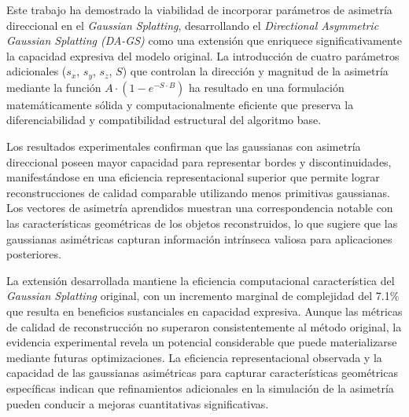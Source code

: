 \begin{conclusions}

Este trabajo ha demostrado la viabilidad de incorporar parámetros de asimetría direccional en el \textit{Gaussian Splatting}, desarrollando el \textit{Directional Asymmetric Gaussian Splatting (DA-GS)} como una extensión que enriquece significativamente la capacidad expresiva del modelo original. La introducción de cuatro parámetros adicionales ($s_x$, $s_y$, $s_z$, $S$) que controlan la dirección y magnitud de la asimetría mediante la función $A \cdot (1-e^{-S \cdot B})$ ha resultado en una formulación matemáticamente sólida y computacionalmente eficiente que preserva la diferenciabilidad y compatibilidad estructural del algoritmo base.

Los resultados experimentales confirman que las gaussianas con asimetría direccional poseen mayor capacidad para representar bordes y discontinuidades, manifestándose en una eficiencia representacional superior que permite lograr reconstrucciones de calidad comparable utilizando menos primitivas gaussianas. Los vectores de asimetría aprendidos muestran una correspondencia notable con las características geométricas de los objetos reconstruidos, lo que sugiere que las gaussianas asimétricas capturan información intrínseca valiosa para aplicaciones posteriores.

La extensión desarrollada mantiene la eficiencia computacional característica del \textit{Gaussian Splatting} original, con un incremento marginal de complejidad del 7.1\% que resulta en beneficios sustanciales en capacidad expresiva. Aunque las métricas de calidad de reconstrucción no superaron consistentemente al método original, la evidencia experimental revela un potencial considerable que puede materializarse mediante futuras optimizaciones. La eficiencia representacional observada y la capacidad de las gaussianas asimétricas para capturar características geométricas específicas indican que refinamientos adicionales en la simulación de la asimetría pueden conducir a mejoras cuantitativas significativas.


\end{conclusions}
